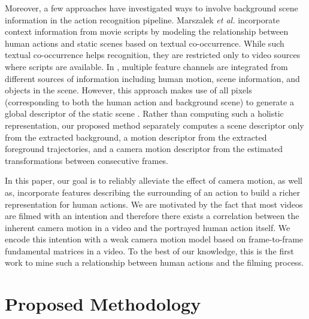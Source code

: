 \documentclass[runningheads]{llncs}
\begin{document}
Moreover, a few approaches have investigated ways to involve background scene information in the action recognition pipeline. Marszalek \emph{et al.} \cite{marszalek2009} incorporate context information from movie scripts by modeling the relationship between human actions and static scenes based on textual co-occurrence. While such textual co-occurrence helps recognition, they are restricted only to video sources where scripts are available. In \cite{ikizler2010}, multiple feature channels are integrated from different sources of information including human motion, scene information, and objects in the scene. However, this approach makes use of all pixels (corresponding to both the human action and background scene) to generate a global descriptor of the static scene \cite{oliva2001}. Rather than computing such a holistic representation, our proposed method separately computes a scene descriptor only from the extracted background, a motion descriptor from the extracted foreground trajectories, and a camera motion descriptor from the estimated transformations between consecutive frames.

In this paper, our goal is to reliably alleviate the effect of camera motion, as well as, incorporate features describing the surrounding of an action to build a richer representation for human actions. We are motivated by the fact that most videos are filmed with an intention and therefore there exists a correlation between the inherent camera motion in a video and the portrayed human action itself. We encode this intention with a weak camera motion model based on frame-to-frame fundamental matrices in a video. To the best of our knowledge, this is the first work to mine such a relationship between human actions and the filming process.

\section{Proposed Methodology} \label{methodology}
\end{document}
